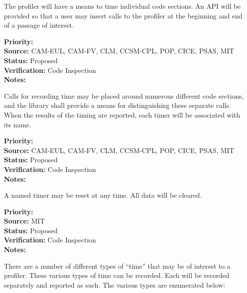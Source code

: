 

The profiler will have a means to time individual code sections.  An API will be 
provided so that a user may insert calls to the profiler at the beginning and
end of a passage of interest.

\begin{reqlist}
{\bf Priority:} \\
{\bf Source:} CAM-EUL, CAM-FV, CLM, CCSM-CPL, POP, CICE, PSAS, MIT \\
{\bf Status:} Proposed \\
{\bf Verification:} Code Inspection \\
{\bf Notes:} 
\end{reqlist}


Calls for recording time may be placed around numerous different code sections, 
and the library shall provide a means for distinguishing these separate calls.  When
the results of the timing are reported, each timer will be associated with its name.

\begin{reqlist}
{\bf Priority:} \\
{\bf Source:} CAM-EUL, CAM-FV, CLM, CCSM-CPL, POP, CICE, PSAS, MIT \\
{\bf Status:} Proposed \\
{\bf Verification:} Code Inspection \\
{\bf Notes:} 
\end{reqlist}


A named timer may be reset at any time.  All data will be cleared.

\begin{reqlist}
{\bf Priority:} \\
{\bf Source:} MIT \\
{\bf Status:} Proposed \\
{\bf Verification:} Code Inspection \\
{\bf Notes:} 
\end{reqlist}


There are
a number of different types of ``time'' that may be of interest to a profiler.
These various types of time can be recorded.  Each will be recorded separately and reported
as such.  The various types are enumerated below:

